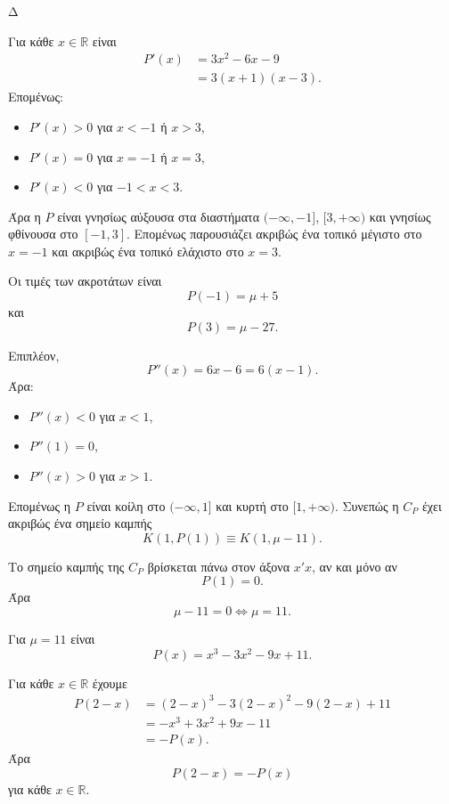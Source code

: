\begin{thema}{Δ}
\begin{erwthma}
\item Για κάθε $x\in\mathbb{R}$ είναι
\begin{align*}
P'(x)
&=3x^2-6x-9\\
&=3(x+1)(x-3).
\end{align*}
Επομένως:
\begin{itemize}
\item $P'(x)>0$ για $x<-1$ ή $x>3$,
\item $P'(x)=0$ για $x=-1$ ή $x=3$,
\item $P'(x)<0$ για $-1<x<3$.
\end{itemize}
Άρα η $P$ είναι γνησίως αύξουσα στα διαστήματα $(-\infty,-1]$, $[3,+\infty)$ και γνησίως φθίνουσα στο $[-1,3]$. Επομένως παρουσιάζει ακριβώς ένα τοπικό μέγιστο στο $x=-1$ και ακριβώς ένα τοπικό ελάχιστο στο $x=3$.

Οι τιμές των ακροτάτων είναι
\[
P(-1)=\mu+5
\]
και
\[
P(3)=\mu-27.
\]

Επιπλέον,
\[
P''(x)=6x-6=6(x-1).
\]
Άρα:
\begin{itemize}
\item $P''(x)<0$ για $x<1$,
\item $P''(1)=0$,
\item $P''(x)>0$ για $x>1$.
\end{itemize}
Επομένως η $P$ είναι κοίλη στο $(-\infty,1]$ και κυρτή στο $[1,+\infty)$. Συνεπώς η $C_P$ έχει ακριβώς ένα σημείο καμπής
\[
{K(1,P(1))\equiv K(1,\mu-11)}.
\]

\item Το σημείο καμπής της $C_P$ βρίσκεται πάνω στον άξονα $x'x$, αν και μόνο αν
\[
P(1)=0.
\]
Άρα
\[
\mu-11=0
\Leftrightarrow
{\mu=11}.
\]
\end{erwthma}

Για $\mu=11$ είναι
\[
P(x)=x^3-3x^2-9x+11.
\]

\begin{erwthma}[resume]
\item
\begin{alist}
\item Για κάθε $x\in\mathbb{R}$ έχουμε
\begin{align*}
P(2-x)
&=(2-x)^3-3(2-x)^2-9(2-x)+11\\
&=-x^3+3x^2+9x-11\\
&=-P(x).
\end{align*}
Άρα
\[
{P(2-x)=-P(x)}
\]
για κάθε $x\in\mathbb{R}$.


\end{alist}
\end{erwthma}
\end{thema}
